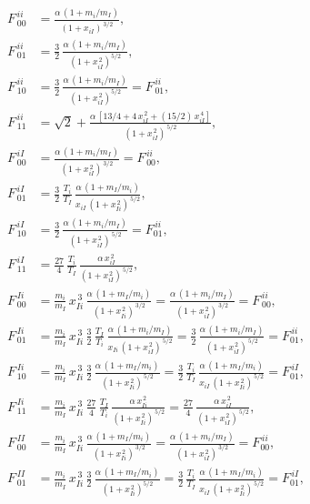 \documentclass[12pt]{article}
\begin{document}
\begin{align}
F^{\,ii}_{\,00} &= \frac{\alpha\,(1+m_i/m_I)}{(1+x_{iI})^{\,3/2}},\\[0.5ex]
F^{\,ii}_{\,01}&=\frac{3}{2}\,\frac{\alpha\,(1+m_i/m_I)}{(1+x_{iI}^{\,2})^{5/2}},\\[0.5ex]
F^{\,ii}_{\,10}&=\frac{3}{2}\,\frac{\alpha\,(1+m_i/m_I)}{(1+x_{iI}^{\,2})^{5/2}}=F^{\,ii}_{\,01},\\[0.5ex]
F^{\,ii}_{\,11}& =\sqrt{2}+ \frac{\alpha\,[13/4+4\,x_{iI}^{\,2}+(15/2)\,x_{iI}^{\,4}]}{(1+x_{iI}^{\,2})^{\,5/2}},\\[0.5ex]
F^{\,iI}_{\,00} &=\frac{\alpha\,(1+m_i/m_I)}{(1+x_{iI}^{\,2})^{\,3/2}}=F^{\,ii}_{\,00},\\[0.5ex]
F^{\,iI}_{\,01}&= \frac{3}{2}\,\frac{T_i}{T_I}\,\frac{\alpha\,(1+m_I/m_i)}{x_{iI}\,(1+x_{Ii}^{\,2})^{\,5/2}},\\[0.5ex]
F^{\,iI}_{\,10}&=\frac{3}{2}\,\frac{\alpha\,(1+m_i/m_I)}{(1+x_{iI}^{\,2})^{\,5/2}}=F^{\,ii}_{01},\\[0.5ex]
F^{\,iI}_{\,11}& =\frac{27}{4}\,\frac{T_i}{T_I}\,\frac{\alpha\,x_{iI}^{\,2}}{(1+x_{iI}^{\,2})^{\,5/2}},\\[0.5ex]
F^{\,Ii}_{\,00} &=\frac{m_i}{m_I}\,x_{Ii}^{\,3}\,\frac{\alpha\,(1+m_I/m_i)}{(1+x_{Ii}^{\,2})^{\,3/2}}=
\frac{\alpha\,(1+m_i/m_I)}{(1+x_{iI}^{\,2})^{\,3/2}}=F^{\,ii}_{\,00},\\[0.5ex]
F^{\,Ii}_{\,01}&=\frac{m_i}{m_I}\,x_{Ii}^{\,3}\,\frac{3}{2}\,\frac{T_I}{T_i}\,\frac{\alpha\,(1+m_i/m_I)}{x_{Ii}\,(1+x_{iI}^{\,2})^{\,5/2}}=\frac{3}{2}\,\frac{\alpha\,(1+m_i/m_I)}{(1+x_{iI}^{\,2})^{\,5/2}}=F^{\,ii}_{01},\\[0.5ex]
F^{\,Ii}_{\,10}&=\frac{m_i}{m_I}\,x_{Ii}^{\,3}\,\frac{3}{2}\,\frac{\alpha\,(1+m_I/m_i)}{(1+x_{Ii}^{\,2})^{\,5/2}}=\frac{3}{2}\,\frac{T_i}{T_I}\,\frac{\alpha\,(1+m_I/m_i)}{x_{iI}\,(1+x_{Ii}^{\,2})^{\,5/2}}=F^{\,iI}_{01},\\[0.5ex]
F^{\,Ii}_{\,11}& =\frac{m_i}{m_I}\,x_{Ii}^{\,3}\,\frac{27}{4}\,\frac{T_I}{T_i}\,\frac{\alpha\,x_{Ii}^{\,2}}{(1+x_{Ii}^{\,2})^{\,5/2}}=\frac{27}{4}\,\frac{\alpha\,x_{iI}^{\,2}}{(1+x_{iI}^{\,2})^{\,5/2}},\\[0.5ex]
F^{\,II}_{\,00} &= \frac{m_i}{m_I}\,x_{Ii}^{\,3}\,\frac{\alpha\,(1+m_I/m_i)}{(1+x_{Ii}^{\,2})^{\,3/2}}=\frac{\alpha\,(1+m_i/m_I)}{(1+x_{iI}^{\,2})^{\,3/2}}=F^{\,ii}_{00},\\[0.5ex]
F^{\,II}_{\,01}&=\frac{m_i}{m_I}\,x_{Ii}^{\,3}\,\frac{3}{2}\,\frac{\alpha\,(1+m_I/m_i)}{(1+x_{Ii}^{\,2})^{5/2}}
=\frac{3}{2}\,\frac{T_i}{T_I}\,\frac{\alpha\,(1+m_I/m_i)}{x_{iI}\,(1+x_{Ii}^{\,2})^{\,5/2}}=F^{\,iI}_{01},\\[0.5ex]

\end{align}
\end{document}

